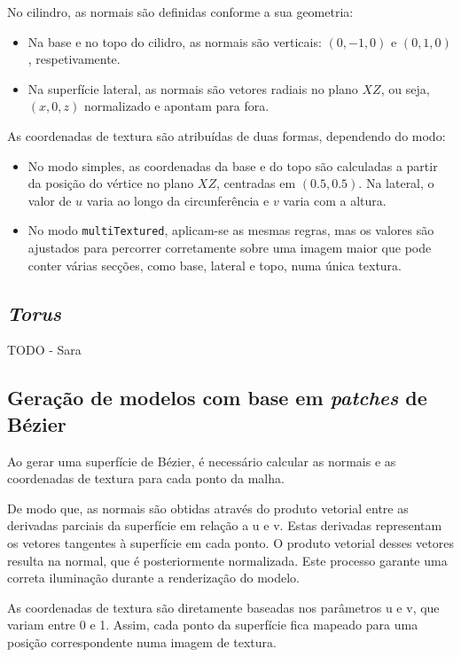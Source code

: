 \documentclass[12pt, a4paper]{article}
\begin{document}
No cilindro, as normais são definidas conforme a sua geometria:

\begin{itemize}
    \item Na base e no topo do cilidro, as normais são verticais: $(0, -1, 0)$ e $(0, 1, 0)$,
    respetivamente.
    \item Na superfície lateral, as normais são vetores radiais no plano $XZ$, ou seja, $(x, 0, z)$
    normalizado e apontam para fora.
\end{itemize}

As coordenadas de textura são atribuídas de duas formas, dependendo do modo:

\begin{itemize}
    \item No modo simples, as coordenadas da base e do topo são calculadas a partir da posição do
    vértice no plano $XZ$, centradas em $(0.5, 0.5)$. Na lateral, o valor de $u$ varia ao longo da
    circunferência e $v$ varia com a altura.
    \item No modo \texttt{multiTextured}, aplicam-se as mesmas regras, mas os valores são ajustados
    para percorrer corretamente sobre uma imagem maior que pode conter várias secções, como base,
    lateral e topo, numa única textura.
\end{itemize}

\subsection{\emph{Torus}}

{\color{red} TODO - Sara}

\subsection{Geração de modelos com base em \emph{patches} de Bézier}

Ao gerar uma superfície de Bézier, é necessário calcular as normais e as coordenadas de textura para
cada ponto da malha.

De modo que, as normais são obtidas através do produto vetorial entre as derivadas
parciais da superfície em relação a u e v. Estas derivadas representam os vetores tangentes à
superfície em cada ponto. O produto vetorial desses vetores resulta na normal, que é posteriormente
normalizada. Este processo garante uma correta iluminação durante a renderização do modelo.

As coordenadas de textura são diretamente baseadas nos parâmetros u e v, que variam entre 0 e 1.
Assim, cada ponto da superfície fica mapeado para uma posição correspondente numa imagem de textura.
\end{document}
